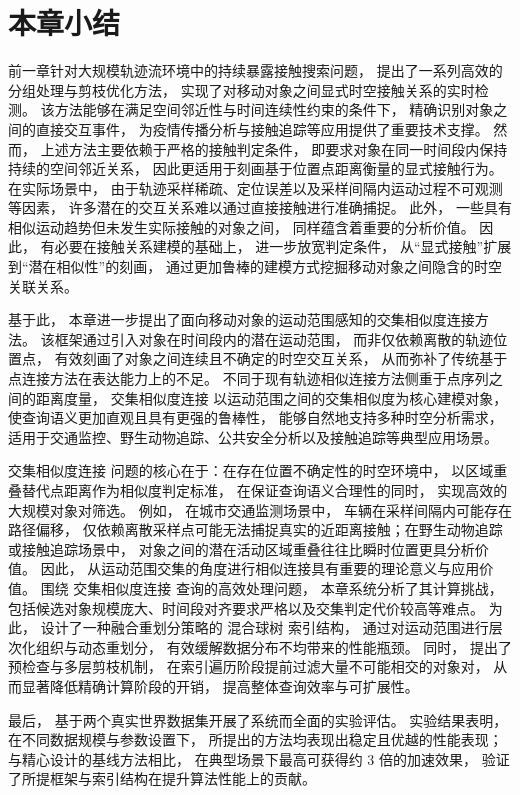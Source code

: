 \section{本章小结}
前一章针对大规模轨迹流环境中的持续暴露接触搜索问题， 提出了一系列高效的分组处理与剪枝优化方法， 实现了对移动对象之间显式时空接触关系的实时检测。 该方法能够在满足空间邻近性与时间连续性约束的条件下， 精确识别对象之间的直接交互事件， 为疫情传播分析与接触追踪等应用提供了重要技术支撑。 然而， 上述方法主要依赖于严格的接触判定条件， 即要求对象在同一时间段内保持持续的空间邻近关系， 因此更适用于刻画基于位置点距离衡量的显式接触行为。 在实际场景中， 由于轨迹采样稀疏、定位误差以及采样间隔内运动过程不可观测等因素， 许多潜在的交互关系难以通过直接接触进行准确捕捉。 此外， 一些具有相似运动趋势但未发生实际接触的对象之间， 同样蕴含着重要的分析价值。 因此， 有必要在接触关系建模的基础上， 进一步放宽判定条件， 从“显式接触”扩展到“潜在相似性”的刻画， 通过更加鲁棒的建模方式挖掘移动对象之间隐含的时空关联关系。

基于此， 本章进一步提出了面向移动对象的运动范围感知的交集相似度连接方法。 该框架通过引入对象在时间段内的潜在运动范围， 而非仅依赖离散的轨迹位置点， 有效刻画了对象之间连续且不确定的时空交互关系， 从而弥补了传统基于点连接方法在表达能力上的不足。 不同于现有轨迹相似连接方法侧重于点序列之间的距离度量， 交集相似度连接 以运动范围之间的交集相似度为核心建模对象， 使查询语义更加直观且具有更强的鲁棒性， 能够自然地支持多种时空分析需求， 适用于交通监控、野生动物追踪、公共安全分析以及接触追踪等典型应用场景。

交集相似度连接 问题的核心在于：在存在位置不确定性的时空环境中， 以区域重叠替代点距离作为相似度判定标准， 在保证查询语义合理性的同时， 实现高效的大规模对象对筛选。 例如， 在城市交通监测场景中， 车辆在采样间隔内可能存在路径偏移， 仅依赖离散采样点可能无法捕捉真实的近距离接触；在野生动物追踪或接触追踪场景中， 对象之间的潜在活动区域重叠往往比瞬时位置更具分析价值。 因此， 从运动范围交集的角度进行相似连接具有重要的理论意义与应用价值。
围绕 交集相似度连接 查询的高效处理问题， 本章系统分析了其计算挑战， 包括候选对象规模庞大、时间段对齐要求严格以及交集判定代价较高等难点。 为此， 设计了一种融合重划分策略的 混合球树 索引结构， 通过对运动范围进行层次化组织与动态重划分， 有效缓解数据分布不均带来的性能瓶颈。 同时， 提出了预检查与多层剪枝机制， 在索引遍历阶段提前过滤大量不可能相交的对象对， 从而显著降低精确计算阶段的开销， 提高整体查询效率与可扩展性。

最后， 基于两个真实世界数据集开展了系统而全面的实验评估。 实验结果表明， 在不同数据规模与参数设置下， 所提出的方法均表现出稳定且优越的性能表现；与精心设计的基线方法相比， 在典型场景下最高可获得约 3 倍的加速效果， 验证了所提框架与索引结构在提升算法性能上的贡献。
